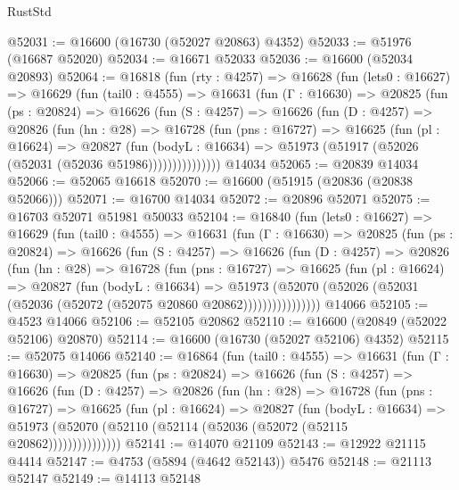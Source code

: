\begin{lexlean}{RustStd}
\begin{coremodule}
{\begin{coremodule}
{{{{{{{{{{{{{{{{{{{{{{{{{{{{{{{{{{{{{{{{{{{{{{{{{{{{{{{@52031 := @16600 (@16730 (@52027 @20863) @4352)
@52033 := @51976 (@16687 @52020)
@52034 := @16671 @52033
@52036 := @16600 (@52034 @20893)
@52064 := @16818
    (fun (rty : @4257) =>
    @16628
      (fun (lets0 : @16627) =>
      @16629
        (fun (tail0 : @4555) =>
        @16631
          (fun (Γ : @16630) =>
          @20825
            (fun (ps : @20824) =>
            @16626
              (fun (S : @4257) =>
              @16626
                (fun (D : @4257) =>
                @20826
                  (fun (hn : @28) =>
                  @16728
                    (fun (pns : @16727) =>
                    @16625
                      (fun (pl : @16624) =>
                      @20827
                        (fun (bodyL : @16634) =>
                        @51973 (@51917 (@52026 (@52031 (@52036 @51986)))))))))))))))
    @14034
@52065 := @20839 @14034
@52066 := @52065 @16618
@52070 := @16600 (@51915 (@20836 (@20838 @52066)))
@52071 := @16700 @14034
@52072 := @20896 @52071
@52075 := @16703 @52071 @51981 @50033
@52104 := @16840
    (fun (lets0 : @16627) =>
    @16629
      (fun (tail0 : @4555) =>
      @16631
        (fun (Γ : @16630) =>
        @20825
          (fun (ps : @20824) =>
          @16626
            (fun (S : @4257) =>
            @16626
              (fun (D : @4257) =>
              @20826
                (fun (hn : @28) =>
                @16728
                  (fun (pns : @16727) =>
                  @16625
                    (fun (pl : @16624) =>
                    @20827
                      (fun (bodyL : @16634) =>
                      @51973
                        (@52070
                          (@52026 (@52031 (@52036 (@52072 (@52075 @20860 @20862))))))))))))))))
    @14066
@52105 := @4523 @14066
@52106 := @52105 @20862
@52110 := @16600 (@20849 (@52022 @52106) @20870)
@52114 := @16600 (@16730 (@52027 @52106) @4352)
@52115 := @52075 @14066
@52140 := @16864
    (fun (tail0 : @4555) =>
    @16631
      (fun (Γ : @16630) =>
      @20825
        (fun (ps : @20824) =>
        @16626
          (fun (S : @4257) =>
          @16626
            (fun (D : @4257) =>
            @20826
              (fun (hn : @28) =>
              @16728
                (fun (pns : @16727) =>
                @16625
                  (fun (pl : @16624) =>
                  @20827
                    (fun (bodyL : @16634) =>
                    @51973 (@52070 (@52110 (@52114 (@52036 (@52072 (@52115 @20862)))))))))))))))
@52141 := @14070 @21109
@52143 := @12922 @21115 @4414
@52147 := @4753 (@5894 (@4642 @52143)) @5476
@52148 := @21113 @52147
@52149 := @14113 @52148
}}}}}}}}}}}}}}}}}}}}}}}}}}}}}}}}}}}}}}}}}}}}}}}}}}}}}}}
\end{coremodule}}
\end{coremodule}
\end{lexlean}
